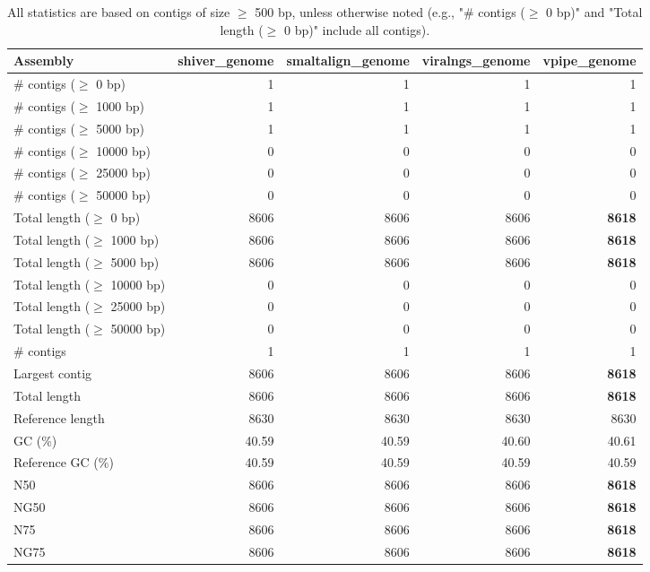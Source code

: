 \documentclass[12pt,a4paper]{article}
\begin{document}
\begin{table}[ht]
\begin{center}
\caption{All statistics are based on contigs of size $\geq$ 500 bp, unless otherwise noted (e.g., "\# contigs ($\geq$ 0 bp)" and "Total length ($\geq$ 0 bp)" include all contigs).}
\begin{tabular}{|l*{4}{|r}|}
\hline
Assembly & shiver\_genome & smaltalign\_genome & viralngs\_genome & vpipe\_genome \\ \hline
\# contigs ($\geq$ 0 bp) & 1 & 1 & 1 & 1 \\ \hline
\# contigs ($\geq$ 1000 bp) & 1 & 1 & 1 & 1 \\ \hline
\# contigs ($\geq$ 5000 bp) & 1 & 1 & 1 & 1 \\ \hline
\# contigs ($\geq$ 10000 bp) & 0 & 0 & 0 & 0 \\ \hline
\# contigs ($\geq$ 25000 bp) & 0 & 0 & 0 & 0 \\ \hline
\# contigs ($\geq$ 50000 bp) & 0 & 0 & 0 & 0 \\ \hline
Total length ($\geq$ 0 bp) & 8606 & 8606 & 8606 & {\bf 8618} \\ \hline
Total length ($\geq$ 1000 bp) & 8606 & 8606 & 8606 & {\bf 8618} \\ \hline
Total length ($\geq$ 5000 bp) & 8606 & 8606 & 8606 & {\bf 8618} \\ \hline
Total length ($\geq$ 10000 bp) & 0 & 0 & 0 & 0 \\ \hline
Total length ($\geq$ 25000 bp) & 0 & 0 & 0 & 0 \\ \hline
Total length ($\geq$ 50000 bp) & 0 & 0 & 0 & 0 \\ \hline
\# contigs & 1 & 1 & 1 & 1 \\ \hline
Largest contig & 8606 & 8606 & 8606 & {\bf 8618} \\ \hline
Total length & 8606 & 8606 & 8606 & {\bf 8618} \\ \hline
Reference length & 8630 & 8630 & 8630 & 8630 \\ \hline
GC (\%) & 40.59 & 40.59 & 40.60 & 40.61 \\ \hline
Reference GC (\%) & 40.59 & 40.59 & 40.59 & 40.59 \\ \hline
N50 & 8606 & 8606 & 8606 & {\bf 8618} \\ \hline
NG50 & 8606 & 8606 & 8606 & {\bf 8618} \\ \hline
N75 & 8606 & 8606 & 8606 & {\bf 8618} \\ \hline
NG75 & 8606 & 8606 & 8606 & {\bf 8618} \\ \hline

\end{tabular}
\end{center}
\end{table}
\end{document}
